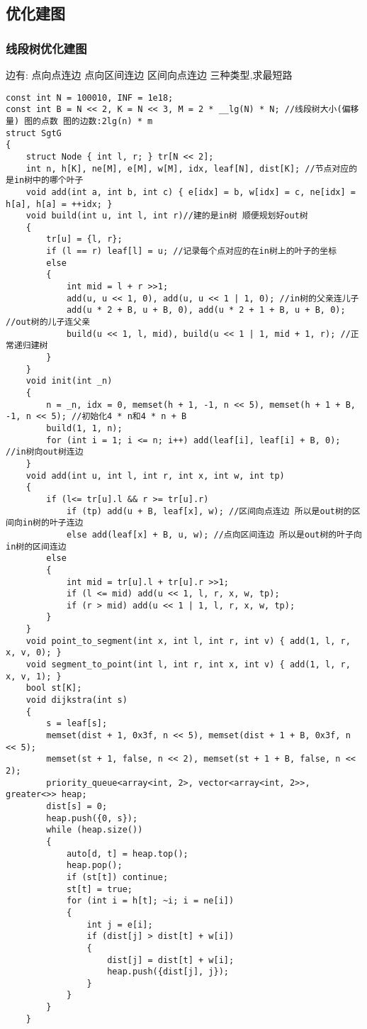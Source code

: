 \documentclass[a4paper, fontset=none]{ctexart}
\begin{document}
\subsection{优化建图}
\subsubsection{线段树优化建图}

边有: \quad 点向点连边 \quad 点向区间连边 \quad 区间向点连边 \quad 三种类型,求最短路


\begin{verbatim}
const int N = 100010, INF = 1e18;
const int B = N << 2, K = N << 3, M = 2 * __lg(N) * N; //线段树大小(偏移量) 图的点数 图的边数:2lg(n) * m
struct SgtG
{
    struct Node { int l, r; } tr[N << 2];
    int n, h[K], ne[M], e[M], w[M], idx, leaf[N], dist[K]; //节点对应的是in树中的哪个叶子
    void add(int a, int b, int c) { e[idx] = b, w[idx] = c, ne[idx] = h[a], h[a] = ++idx; }
    void build(int u, int l, int r)//建的是in树 顺便规划好out树
    {
        tr[u] = {l, r};
        if (l == r) leaf[l] = u; //记录每个点对应的在in树上的叶子的坐标
        else
        {
            int mid = l + r >>1;
            add(u, u << 1, 0), add(u, u << 1 | 1, 0); //in树的父亲连儿子
            add(u * 2 + B, u + B, 0), add(u * 2 + 1 + B, u + B, 0); //out树的儿子连父亲
            build(u << 1, l, mid), build(u << 1 | 1, mid + 1, r); //正常递归建树
        }
    }
    void init(int _n)
    {
        n = _n, idx = 0, memset(h + 1, -1, n << 5), memset(h + 1 + B, -1, n << 5); //初始化4 * n和4 * n + B
        build(1, 1, n);
        for (int i = 1; i <= n; i++) add(leaf[i], leaf[i] + B, 0); //in树向out树连边
    }
    void add(int u, int l, int r, int x, int w, int tp)
    {
        if (l<= tr[u].l && r >= tr[u].r)
            if (tp) add(u + B, leaf[x], w); //区间向点连边 所以是out树的区间向in树的叶子连边
            else add(leaf[x] + B, u, w); //点向区间连边 所以是out树的叶子向in树的区间连边
        else
        {
            int mid = tr[u].l + tr[u].r >>1;
            if (l <= mid) add(u << 1, l, r, x, w, tp);
            if (r > mid) add(u << 1 | 1, l, r, x, w, tp);
        }
    }
    void point_to_segment(int x, int l, int r, int v) { add(1, l, r, x, v, 0); }
    void segment_to_point(int l, int r, int x, int v) { add(1, l, r, x, v, 1); }
    bool st[K];
    void dijkstra(int s)
    {
        s = leaf[s];
        memset(dist + 1, 0x3f, n << 5), memset(dist + 1 + B, 0x3f, n << 5);
        memset(st + 1, false, n << 2), memset(st + 1 + B, false, n << 2);
        priority_queue<array<int, 2>, vector<array<int, 2>>, greater<>> heap;
        dist[s] = 0;
        heap.push({0, s});
        while (heap.size())
        {
            auto[d, t] = heap.top();
            heap.pop();
            if (st[t]) continue;
            st[t] = true;
            for (int i = h[t]; ~i; i = ne[i])
            {
                int j = e[i];
                if (dist[j] > dist[t] + w[i])
                {
                    dist[j] = dist[t] + w[i];
                    heap.push({dist[j], j});
                }
            }
        }
    }


\end{verbatim}
\end{document}
